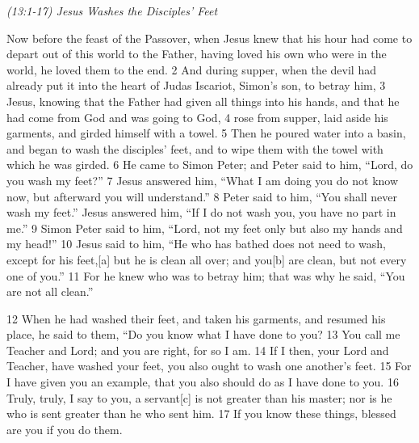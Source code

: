 \documentclass[letterpaper]{report}
\begin{document}
{\centering
	\emph{(13:1-17) Jesus Washes the Disciples’ Feet}\\
}
\begin{multicols}{2}
Now before the feast of the Passover, when Jesus knew that his hour had come to depart out of this world to the Father, having loved his own who were in the world, he loved them to the end. 2 And during supper, when the devil had already put it into the heart of Judas Iscariot, Simon’s son, to betray him, 3 Jesus, knowing that the Father had given all things into his hands, and that he had come from God and was going to God, 4 rose from supper, laid aside his garments, and girded himself with a towel. 5 Then he poured water into a basin, and began to wash the disciples’ feet, and to wipe them with the towel with which he was girded. 6 He came to Simon Peter; and Peter said to him, “Lord, do you wash my feet?” 7 Jesus answered him, “What I am doing you do not know now, but afterward you will understand.” 8 Peter said to him, “You shall never wash my feet.” Jesus answered him, “If I do not wash you, you have no part in me.” 9 Simon Peter said to him, “Lord, not my feet only but also my hands and my head!” 10 Jesus said to him, “He who has bathed does not need to wash, except for his feet,[a] but he is clean all over; and you[b] are clean, but not every one of you.” 11 For he knew who was to betray him; that was why he said, “You are not all clean.”

12 When he had washed their feet, and taken his garments, and resumed his place, he said to them, “Do you know what I have done to you? 13 You call me Teacher and Lord; and you are right, for so I am. 14 If I then, your Lord and Teacher, have washed your feet, you also ought to wash one another’s feet. 15 For I have given you an example, that you also should do as I have done to you. 16 Truly, truly, I say to you, a servant[c] is not greater than his master; nor is he who is sent greater than he who sent him. 17 If you know these things, blessed are you if you do them.
\end{multicols}
\end{document}
